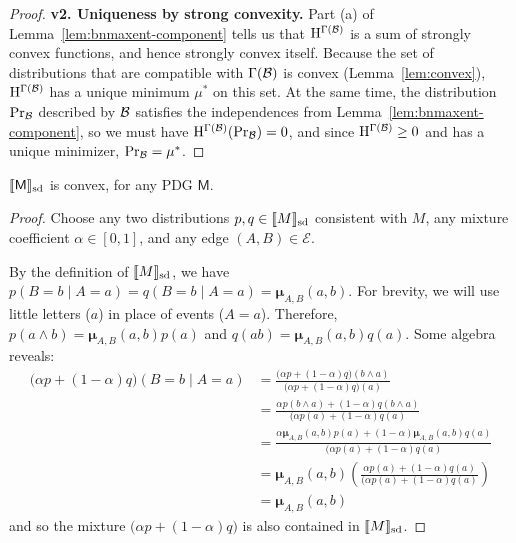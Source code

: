 \documentclass{article}
\newcommand{\bmu}{\boldsymbol{\mu}}
\newcommand{\Ed}{\mathcal E}
\newcommand{\sfM}{\mathsf M}
\newcommand\SD{_{\text{sd}}}
\begin{document}
\begin{proof}
	\textbf{v2. Uniqueness by strong convexity.}
	Part (a) of Lemma~\ref{lem:bnmaxent-component} tells us that $\mathrm{H}^{\Gamma(\mathcal B)}$ is a sum of strongly convex functions, and hence strongly convex itself. Because the set of distributions that are compatible with $\Gamma(\cal B)$ is convex (Lemma~\ref{lem:convex}), $\mathrm{H}^{\Gamma(\mathcal B)}$ has a unique minimum $\mu^*$ on this set. At the same time, the distribution $\Pr_{\cal B}$ described by $\cal B$ satisfies the independences from Lemma~\ref{lem:bnmaxent-component}, so we must have $\mathrm{H}^{\Gamma(\mathcal B)}(\Pr_{\cal B}) = 0$, and since $\mathrm{H}^{\Gamma(\cal B)} \geq 0$ and  has a unique minimizer, $\Pr_{\cal B} = \mu^*$.
\end{proof}

\clearpage

\begin{lemma}
	\label{lem:convex}
	$\bbr{\sfM}\SD$ is convex, for any PDG  $\sfM$.
\end{lemma}%
\begin{proof}
	Choose any two distributions $p, q \in \bbr{M}\SD$ consistent with $M$, any mixture coefficient $\alpha \in [0,1]$, and any edge $(A,B) \in \Ed$.
	
	By the definition of $\bbr{M}\SD$, we have $p(B = b \mid A = a) = q(B = b \mid A = a) = \bmu_{A,B}(a,b)$.  
	For brevity, we will use little letters ($a$) in place of events ($A = a$).
	Therefore, $p(a\land b) = \bmu_{A,B}(a,b) p(a)$ and $q(ab) = \bmu_{A,B}(a,b) q(a)$. Some algebra reveals:
	\begin{align*}
		\Big( \alpha p + (1-\alpha) q \Big) (B = b \mid A = a) &= 
		\frac{\Big( \alpha p + (1-\alpha) q \Big) (b \land a)}{\Big( \alpha p + (1-\alpha) q \Big) (a)} \\
		&= \frac{ \alpha p(b \land a) + (1-\alpha) q(b \land a) }{\Big( \alpha p(a) + (1-\alpha) q (a)} \\
		&= \frac{ \alpha \bmu_{A,B}(a,b) p(a) + (1-\alpha) \bmu_{A,B}(a,b) q(a) }{\Big( \alpha p(a) + (1-\alpha) q (a)} \\
		&=\bmu_{A,B}(a,b) \left(\frac{ \alpha  p(a) + (1-\alpha) q(a) }{\Big( \alpha p(a) + (1-\alpha) q (a)}\right)\\
		&= \bmu_{A,B}(a,b)
	\end{align*}
	and so the mixture $\Big(\alpha p + (1-\alpha) q \Big)$ is also contained in $\bbr{M}\SD$.
\end{proof}
\end{document}

